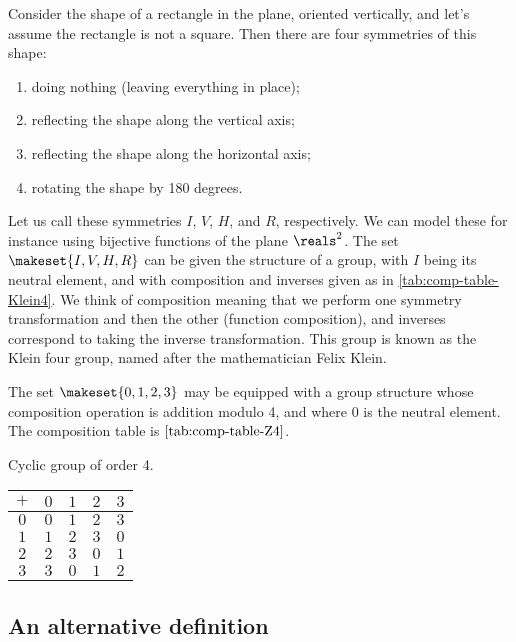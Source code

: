 \begin{example}
\label{exa:grp-Klein4}
Consider the shape of a rectangle in the plane, oriented vertically, and let's assume the rectangle is not a square. Then there are four symmetries of this shape:
\begin{enumerate}
\item doing nothing (leaving everything in place);
\item reflecting the shape along the vertical axis;
\item reflecting the shape along the horizontal axis;
\item rotating the shape by 180 degrees.
\end{enumerate}
Let us call these symmetries $I$, $V$, $H$, and $R$, respectively. We can model these for instance using bijective functions of the plane $\reals^2$. The set $\makeset{I, V, H, R}$ can be given the structure of a group, with $I$ being its neutral element, and with composition and inverses given as in \cref{tab:comp-table-Klein4}. We think of composition meaning that we perform one symmetry transformation and then the other (function composition), and inverses correspond to taking the inverse transformation. This group is known as the Klein four group, named after the mathematician Felix Klein.
\end{example}


\begin{example}
    \label{exa:grp-Z4}
The set $\makeset{0, 1, 2, 3 }$ may be equipped with a group structure whose composition operation is addition modulo 4, and where $0$ is the neutral element. The composition table is $\cref{tab:comp-table-Z4}$.
    \begin{margintable}
    \caption{Cyclic group of order 4.}
    \label{tab:comp-table-Z4}
    \centering
    \begin{tabular}{c|cccc}
        $+$ & $0$ & $1$ & $2$ & $3$ \\
        \hline
        $0$ & $0$ & $1$ & $2$ & $3$ \\
        $1$ & $1$ & $2$ & $3$ & $0$ \\
        $2$ & $2$ & $3$ & $0$ & $1$ \\
        $3$ & $3$ & $0$ & $1$ & $2$
    \end{tabular}
\end{margintable}

\end{example}



\subsection{An alternative definition}

